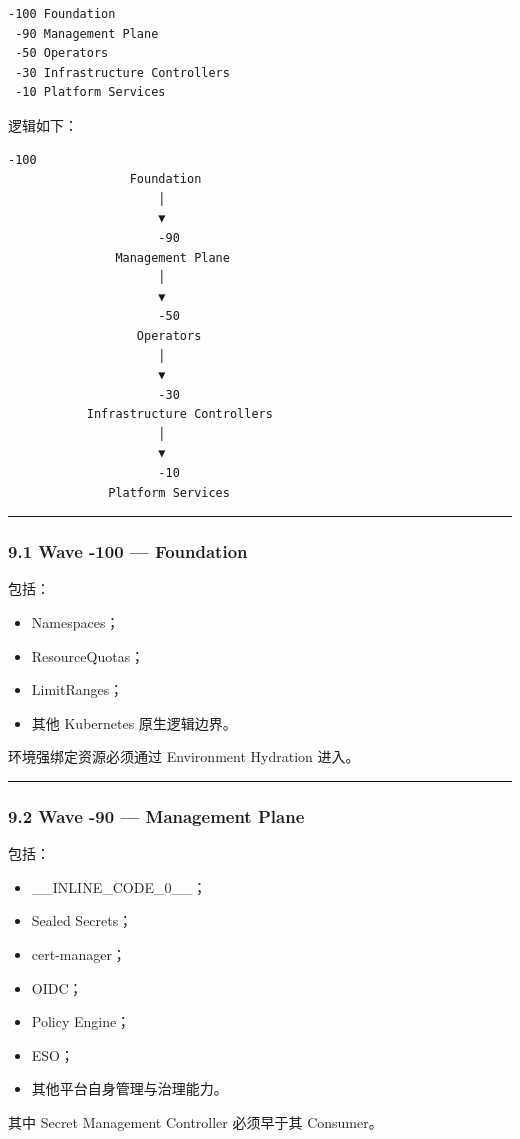 \documentclass[11pt,a4paper]{article}
\begin{document}
\begin{lstlisting}[language=text]
-100 Foundation
 -90 Management Plane
 -50 Operators
 -30 Infrastructure Controllers
 -10 Platform Services
\end{lstlisting}
逻辑如下：

\begin{lstlisting}[language=text]
                    -100
                 Foundation
                     │
                     ▼
                     -90
               Management Plane
                     │
                     ▼
                     -50
                  Operators
                     │
                     ▼
                     -30
           Infrastructure Controllers
                     │
                     ▼
                     -10
              Platform Services
\end{lstlisting}
\vspace{0.5em}\hrule\vspace{0.5em}
\subsubsection{9.1 Wave -100 — Foundation}
包括：

\begin{itemize}
  \item Namespaces；
  \item ResourceQuotas；
  \item LimitRanges；
  \item 其他 Kubernetes 原生逻辑边界。
\end{itemize}
环境强绑定资源必须通过 Environment Hydration 进入。

\vspace{0.5em}\hrule\vspace{0.5em}
\subsubsection{9.2 Wave -90 — Management Plane}
包括：

\begin{itemize}
  \item \_\_INLINE\_CODE\_0\_\_；
  \item Sealed Secrets；
  \item cert-manager；
  \item OIDC；
  \item Policy Engine；
  \item ESO；
  \item 其他平台自身管理与治理能力。
\end{itemize}
其中 Secret Management Controller 必须早于其 Consumer。
\end{document}
